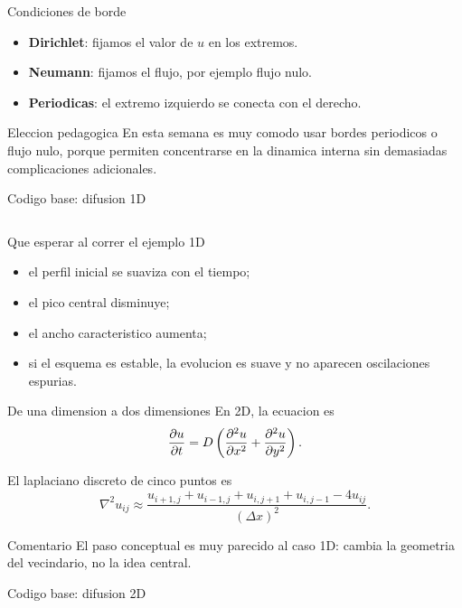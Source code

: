 \begin{frame}{Condiciones de borde}
\begin{itemize}
    \item \textbf{Dirichlet}: fijamos el valor de $u$ en los extremos.
    \item \textbf{Neumann}: fijamos el flujo, por ejemplo flujo nulo.
    \item \textbf{Periodicas}: el extremo izquierdo se conecta con el derecho.
\end{itemize}

\begin{block}{Eleccion pedagogica}
En esta semana es muy comodo usar bordes periodicos o flujo nulo, porque permiten concentrarse en la dinamica interna sin demasiadas complicaciones adicionales.
\end{block}
\end{frame}

\begin{frame}[fragile]{Codigo base: difusion 1D}
\inputminted[firstline=1,lastline=52]{python}{codes/diffusion_1d.py}
\end{frame}

\begin{frame}{Que esperar al correr el ejemplo 1D}
\begin{itemize}
    \item el perfil inicial se suaviza con el tiempo;
    \item el pico central disminuye;
    \item el ancho caracteristico aumenta;
    \item si el esquema es estable, la evolucion es suave y no aparecen oscilaciones espurias.
\end{itemize}
\end{frame}

\begin{frame}{De una dimension a dos dimensiones}
En 2D, la ecuacion es
\[
\pdv{u}{t} = D\left(\pdv[2]{u}{x} + \pdv[2]{u}{y}\right).
\]

El laplaciano discreto de cinco puntos es
\[
\nabla^2 u_{ij} \approx
\frac{u_{i+1,j}+u_{i-1,j}+u_{i,j+1}+u_{i,j-1}-4u_{ij}}{(\Delta x)^2}.
\]

\begin{block}{Comentario}
El paso conceptual es muy parecido al caso 1D: cambia la geometria del vecindario, no la idea central.
\end{block}
\end{frame}

\begin{frame}[fragile]{Codigo base: difusion 2D}
\inputminted[firstline=1,lastline=44]{python}{codes/diffusion_2d.py}
\end{frame}

